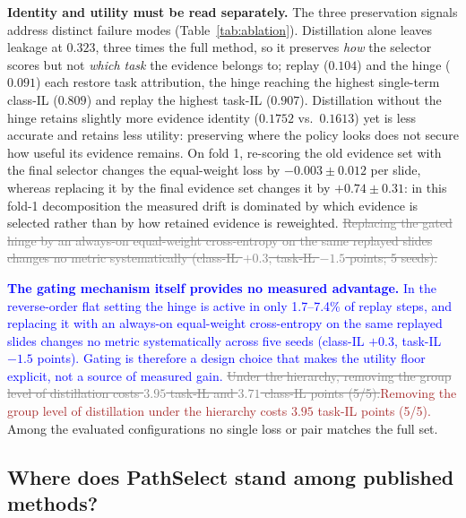 \documentclass{article}
\newif\ifmarkup \markuptrue
\newcommand{\repc}[3]{\ifmarkup\textcolor{gray}{\sout{#2}}\textcolor{#1}{#3}\else#3\fi}
\newcommand{\repB}[2]{\repc{brown}{#1}{#2}}   %
\newcommand{\repL}[2]{\repc{blue}{#1}{#2}}    %
\begin{document}
\textbf{Identity and utility must be read separately.} The three preservation signals address distinct failure modes (Table~\ref{tab:ablation}). Distillation alone leaves leakage at $0.323$, three times the full method, so it preserves \emph{how} the selector scores but not \emph{which task} the evidence belongs to; replay ($0.104$) and the hinge ($0.091$) each restore task attribution, the hinge reaching the highest single-term class-IL ($0.809$) and replay the highest task-IL ($0.907$). Distillation without the hinge retains slightly more evidence identity ($0.1752$ vs.\ $0.1613$) yet is less accurate and retains less utility: preserving where the policy looks does not secure how useful its evidence remains. On fold 1, re-scoring the old evidence set with the final selector changes the equal-weight loss by $-0.003{\pm}0.012$ per slide, whereas replacing it by the final evidence set changes it by $+0.74{\pm}0.31$: in this fold-1 decomposition the measured drift is dominated by which evidence is selected rather than by how retained evidence is reweighted. \repL{Replacing the gated hinge by an always-on equal-weight cross-entropy on the same replayed slides changes no metric systematically (class-IL $+0.3$, task-IL $-1.5$ points; 5 seeds).}{}

\repL{}{\textbf{The gating mechanism itself provides no measured advantage.} In the reverse-order flat setting the hinge is active in only 1.7--7.4\% of replay steps, and replacing it with an always-on equal-weight cross-entropy on the same replayed slides changes no metric systematically across five seeds (class-IL $+0.3$, task-IL $-1.5$ points). Gating is therefore a design choice that makes the utility floor explicit, not a source of measured gain.} \repB{Under the hierarchy, removing the group level of distillation costs $3.95$ task-IL and $3.71$ class-IL points (5/5).}{Removing the group level of distillation under the hierarchy costs $3.95$ task-IL points (5/5).} Among the evaluated configurations no single loss or pair matches the full set.

\subsection{Where does PathSelect stand among published methods?}
\label{ssec:sota}
\end{document}
